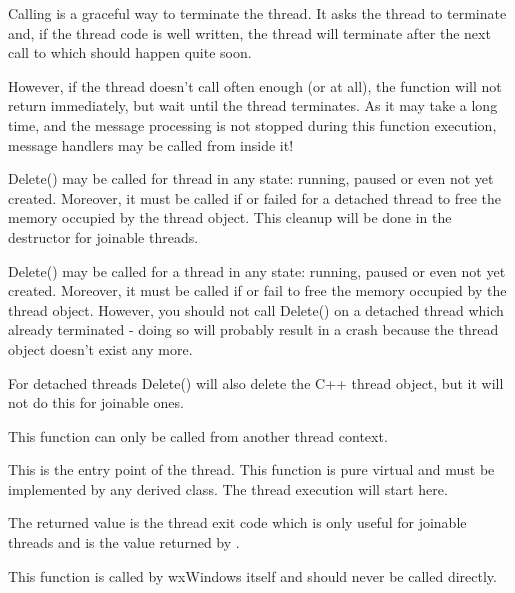 \label{wxthreaddelete}


Calling  is a graceful way to terminate the
thread. It asks the thread to terminate and, if the thread code is well
written, the thread will terminate after the next call to
 which should happen quite soon.

However, if the thread doesn't call 
often enough (or at all), the function will not return immediately, but wait
until the thread terminates. As it may take a long time, and the message processing
is not stopped during this function execution, message handlers may be
called from inside it!

Delete() may be called for thread in any state: running, paused or even not yet
created. Moreover, it must be called if  or
 failed for a detached thread to free the memory
occupied by the thread object. This cleanup will be done in the destructor for joinable
threads.

Delete() may be called for a thread in any state: running, paused or even not yet created. Moreover,
it must be called if  or  fail to free
the memory occupied by the thread object. However, you should not call Delete()
on a detached thread which already terminated - doing so will probably result
in a crash because the thread object doesn't exist any more.

For detached threads Delete() will also delete the C++ thread object, but it
will not do this for joinable ones.

This function can only be called from another thread context.

\label{wxthreadentry}


This is the entry point of the thread. This function is pure virtual and must
be implemented by any derived class. The thread execution will start here.

The returned value is the thread exit code which is only useful for
joinable threads and is the value returned by .

This function is called by wxWindows itself and should never be called
directly.

